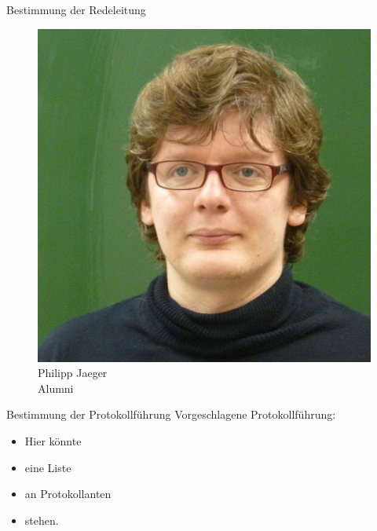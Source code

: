\documentclass[compress, aspectratio=169]{beamer}
\begin{document}
\begin{frame}{Bestimmung der Redeleitung}
\begin{minipage}{0.4\textwidth}
\begin{figure}
\begin{minipage}[c]{.65\textwidth}
					\includegraphics[height=0.5\textheight]{philipp.jpg}%
				\end{minipage} \hfill
				\begin{minipage}[c]{.32\textwidth}
					\caption*{Philipp Jaeger\\ Alumni}
				\end{minipage}
			\end{figure}
		\end{minipage}
		\hspace{0.1\textwidth}
	\end{frame}
	
	\begin{frame}{Bestimmung der Protokollführung}
		Vorgeschlagene Protokollführung:
		\begin{itemize}
			\item Hier könnte 
			\item eine Liste
			\item an Protokollanten
			\item stehen.
		\end{itemize}
	\end{frame}
	
\end{document}
